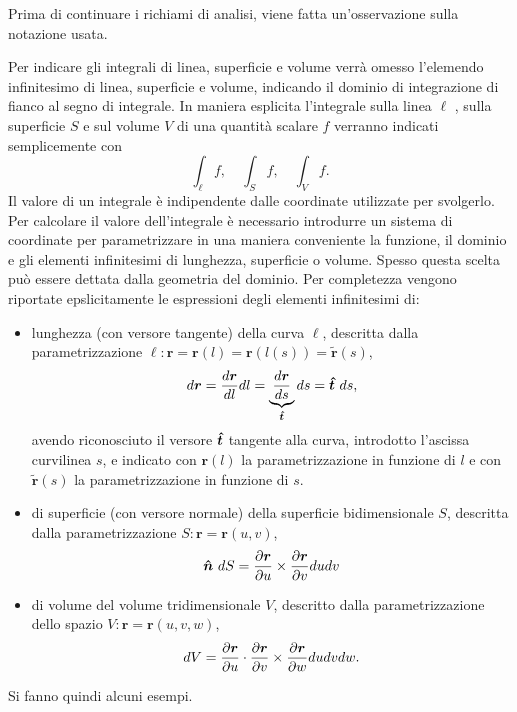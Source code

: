 Prima di continuare i richiami di analisi, viene fatta un'osservazione sulla notazione usata.
\begin{remark}
 Per indicare gli integrali di linea, superficie e volume verrà omesso l'elemendo infinitesimo di linea, superficie e volume, indicando il dominio di integrazione di fianco al segno di integrale. In maniera esplicita l'integrale sulla linea $\ell$ , sulla superficie $S$ e sul volume $V$ di una quantità scalare $f$ verranno indicati semplicemente con
 \begin{equation}
  \int_{\ell} f , \quad \int_S f , \quad \int_V f .
 \end{equation}
 Il valore di un integrale è indipendente dalle coordinate utilizzate per svolgerlo. Per calcolare il valore dell'integrale è necessario introdurre un sistema di coordinate per parametrizzare in una maniera conveniente la funzione, il dominio e gli elementi infinitesimi di lunghezza, superficie o volume. Spesso questa scelta può essere dettata dalla geometria del dominio.
Per completezza vengono riportate epslicitamente le espressioni degli elementi infinitesimi di:
\begin{itemize}
\item lunghezza (con versore tangente) della curva $\ell$, descritta dalla parametrizzazione $\ell: \bm{r} = \bm{r}(l) =  \bm{r}(l(s)) = \bm{\tilde{r}}(s)$,
 \begin{equation}
  d \bm{r} = \dfrac{d \bm{r}}{d l} d l = \underbrace{\dfrac{d \bm{r}}{d s}}_{\bm{\hat{t}}} d s = \bm{\hat{t}} \ ds ,
 \end{equation}
 avendo riconosciuto il versore $\bm{\hat{t}}$ tangente alla curva, introdotto l'ascissa curvilinea $s$, e indicato con $\bm{r}(l)$ la parametrizzazione in funzione di $l$ e con $\bm{\tilde{r}}(s)$ la parametrizzazione in funzione di $s$.
\item di superficie (con versore normale) della superficie bidimensionale $S$, descritta dalla parametrizzazione $S: \bm{r} = \bm{r}(u,v)$,
 \begin{equation}
  \bm{\hat{n}} \ dS = \dfrac{\partial \bm{r}}{\partial u} \times \dfrac{\partial \bm{r}}{\partial v} du dv
 \end{equation}
\item di volume del volume tridimensionale $V$, descritto dalla parametrizzazione dello spazio $V: \bm{r} = \bm{r}(u,v,w)$,
\begin{equation}
 dV = \dfrac{\partial \bm{r}}{\partial u} \cdot  \dfrac{\partial \bm{r}}{\partial v} \times \dfrac{\partial \bm{r}}{\partial w} du dv dw .
\end{equation}
\end{itemize} 
Si fanno quindi alcuni esempi. 

\end{remark}
